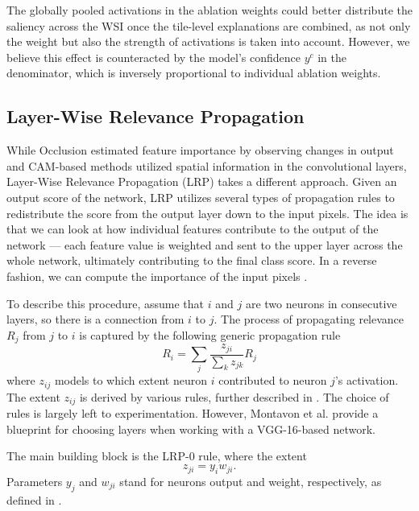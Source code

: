 The globally pooled activations in the ablation weights could better distribute the saliency across the WSI once the tile-level explanations are combined, as not only the weight but also the strength of activations is taken into account.
However, we believe this effect is counteracted by the model's confidence $y^c$ in the denominator, which is inversely proportional to individual ablation weights.

\subsection{Layer-Wise Relevance Propagation}

While Occlusion estimated feature importance by observing changes in output and CAM-based methods utilized spatial information in the convolutional layers, Layer-Wise Relevance Propagation (LRP) \cite{lrp} takes a different approach.
Given an output score of the network, LRP utilizes several types of propagation rules to redistribute the score from the output layer down to the input pixels.
The idea is that we can look at how individual features contribute to the output of the network --- each feature value is weighted and sent to the upper layer across the whole network, ultimately contributing to the final class score.
In a reverse fashion, we can compute the importance of the input pixels \cite{lrp}.

To describe this procedure, assume that $i$ and $j$ are two neurons in consecutive layers, so there is a connection from $i$ to $j$. 
The process of propagating relevance $R_j$ from $j$ to $i$ is captured by the following generic propagation rule \cite{lrp}
\begin{equation}
    R_i = \sum_j \frac{z_{ji}}{\sum_k z_{jk}} R_j
\end{equation}
where $z_{ij}$ models to which extent neuron $i$ contributed to neuron $j$'s activation.
The extent $z_{ij}$ is derived by various rules, further described in \cite{lrp}.
The choice of rules is largely left to experimentation.
However, Montavon et al. \cite{lrp} provide a blueprint for choosing layers when working with a VGG-16-based network.

The main building block is the LRP-$0$ rule, where the extent
\begin{equation}
    z_{ji} = y_i w_{ji}.
\end{equation}
Parameters $y_j$ and $w_{ji}$ stand for neurons output and weight, respectively, as defined in .


